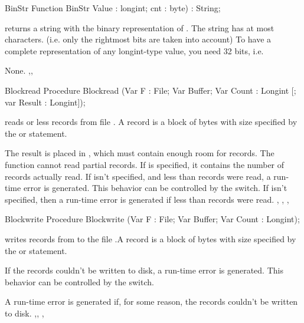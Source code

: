 \documentclass{report}
\begin{document}
\begin{function}{BinStr}
\Declaration
Function BinStr Value : longint; cnt : byte) : String;

\Description
{} returns a string with the binary representation
of . The string has at most  characters.
(i.e. only the  rightmost bits are taken into account)
To have a complete representation of any longint-type value, you need 32
bits, i.e. 

\Errors
None.
\SeeAlso
{},,
\end{function}


\begin{procedure}{Blockread}
\Declaration
Procedure Blockread (Var F : File; Var Buffer; Var Count : Longint [; var
Result : Longint]);

\Description
{} reads  or less records from file . A
record is a block of bytes with size specified by the  or
 statement.

The result is placed in , which must contain enough room for
 records. The function cannot read partial records.
If  is specified, it contains the number of records actually
read. If  isn't specified, and less than  records were
read, a run-time error is generated. This behavior can be controlled by the
 switch.
\Errors
If  isn't specified, then a run-time error is generated if less
than  records were read.
\SeeAlso
{}, , , 
\end{procedure}


\begin{procedure}{Blockwrite}
\Declaration
Procedure Blockwrite (Var F : File; Var Buffer; Var Count : Longint);

\Description
{} writes  records from  to the file
 .A record is a block of bytes with size specified by the  or
 statement.

If the records couldn't be written to disk, a run-time error is generated.
This behavior can be controlled by the  switch.

\Errors
A run-time error is generated if, for some reason, the records couldn't be
written to disk.
\SeeAlso
{},, , 
\end{procedure}
\end{document}
